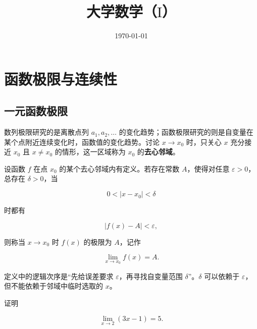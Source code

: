 \documentclass[fontset=fandol]{ctexart}
\title{大学数学（$ \mathrm{I} $）}
\author{}
\date{\today}
\begin{document}
\maketitle

\vspace{-1em}





\section{函数极限与连续性}



\subsection{一元函数极限}



数列极限研究的是离散点列 \(a_1,a_2,\ldots\) 的变化趋势；函数极限研究的则是自变量在某个点附近连续变化时，函数值的变化趋势。讨论 \(x\to x_0\) 时，只关心 \(x\) 充分接近 \(x_0\) 且 \(x\neq x_0\) 的情形，这一区域称为 \(x_0\) 的\textbf{去心邻域}。



\begin{definition}

设函数 \(f\) 在点 \(x_0\) 的某个去心邻域内有定义。若存在常数 \(A\)，使得对任意 \(\varepsilon>0\)，总存在 \(\delta>0\)，当

\[

0<|x-x_0|<\delta

\]

时都有

\[

|f(x)-A|<\varepsilon,

\]

则称当 \(x\to x_0\) 时 \(f(x)\) 的极限为 \(A\)，记作

\[

\lim_{x\to x_0}f(x)=A.

\]

\end{definition}



定义中的逻辑次序是“先给误差要求 \(\varepsilon\)，再寻找自变量范围 \(\delta\)”。\(\delta\) 可以依赖于 \(\varepsilon\)，但不能依赖于邻域中临时选取的 \(x\)。



\begin{example}[按定义证明函数极限]

证明

\[

\lim_{x\to2}(3x-1)=5.

\]

\end{example}
\end{document}
